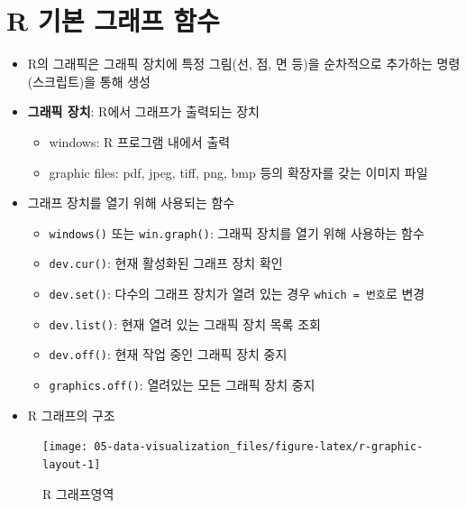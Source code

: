 \documentclass[
  11pt,
]{krantz}
\providecommand{\tightlist}{%
  \setlength{\itemsep}{0pt}\setlength{\parskip}{0pt}}
\begin{document}
\hypertarget{r-basic-graphics}{%
\section{R 기본 그래프 함수}\label{r-basic-graphics}}

\begin{itemize}
\item
  R의 그래픽은 그래픽 장치에 특정 그림(선, 점, 면 등)을 순차적으로 추가하는 명령(스크립트)을 통해 생성
\item
  \textbf{그래픽 장치}: R에서 그래프가 출력되는 장치

  \begin{itemize}
  \tightlist
  \item
    windows: R 프로그램 내에서 출력
  \item
    graphic files: pdf, jpeg, tiff, png, bmp 등의 확장자를 갖는 이미지 파일
  \end{itemize}
\item
  그래프 장치를 열기 위해 사용되는 함수

  \begin{itemize}
  \tightlist
  \item
    \texttt{windows()} 또는 \texttt{win.graph()}: 그래픽 장치를 열기 위해 사용하는 함수
  \item
    \texttt{dev.cur()}: 현재 활성화된 그래프 장치 확인
  \item
    \texttt{dev.set()}: 다수의 그래프 장치가 열려 있는 경우 \texttt{which\ =\ 번호}로 변경
  \item
    \texttt{dev.list()}: 현재 열려 있는 그래픽 장치 목록 조회
  \item
    \texttt{dev.off()}: 현재 작업 중인 그래픽 장치 중지
  \item
    \texttt{graphics.off()}: 열려있는 모든 그래픽 장치 중지
  \end{itemize}
\item
  R 그래프의 구조
\end{itemize}

\footnotesize

\begin{figure}

{\centering \texttt{[image: 05-data-visualization\_files/figure-latex/r-graphic-layout-1]} 

}

\caption{R 그래프영역}\label{fig:r-graphic-layout}
\end{figure}

\normalsize
\end{document}
